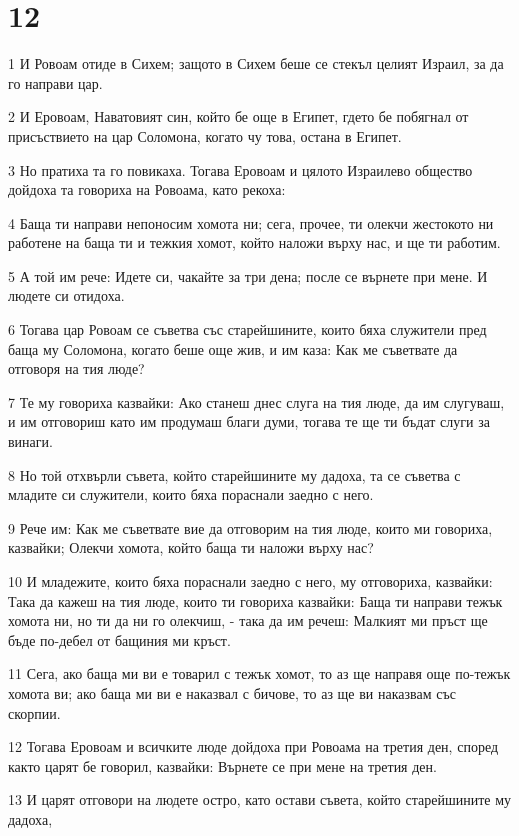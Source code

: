 \chapter{12}

\par 1 И Ровоам отиде в Сихем; защото в Сихем беше се стекъл целият Израил, за да го направи цар.
\par 2 И Еровоам, Наватовият син, който бе още в Египет, гдето бе побягнал от присъствието на цар Соломона, когато чу това, остана в Египет.
\par 3 Но пратиха та го повикаха. Тогава Еровоам и цялото Израилево общество дойдоха та говориха на Ровоама, като рекоха:
\par 4 Баща ти направи непоносим хомота ни; сега, прочее, ти олекчи жестокото ни работене на баща ти и тежкия хомот, който наложи върху нас, и ще ти работим.
\par 5 А той им рече: Идете си, чакайте за три дена; после се върнете при мене. И людете си отидоха.
\par 6 Тогава цар Ровоам се съветва със старейшините, които бяха служители пред баща му Соломона, когато беше още жив, и им каза: Как ме съветвате да отговоря на тия люде?
\par 7 Те му говориха казвайки: Ако станеш днес слуга на тия люде, да им слугуваш, и им отговориш като им продумаш благи думи, тогава те ще ти бъдат слуги за винаги.
\par 8 Но той отхвърли съвета, който старейшините му дадоха, та се съветва с младите си служители, които бяха пораснали заедно с него.
\par 9 Рече им: Как ме съветвате вие да отговорим на тия люде, които ми говориха, казвайки; Олекчи хомота, който баща ти наложи върху нас?
\par 10 И младежите, които бяха пораснали заедно с него, му отговориха, казвайки: Така да кажеш на тия люде, които ти говориха казвайки: Баща ти направи тежък хомота ни, но ти да ни го олекчиш, - така да им речеш: Малкият ми пръст ще бъде по-дебел от бащиния ми кръст.
\par 11 Сега, ако баща ми ви е товарил с тежък хомот, то аз ще направя още по-тежък хомота ви; ако баща ми ви е наказвал с бичове, то аз ще ви наказвам със скорпии.
\par 12 Тогава Еровоам и всичките люде дойдоха при Ровоама на третия ден, според както царят бе говорил, казвайки: Върнете се при мене на третия ден.
\par 13 И царят отговори на людете остро, като остави съвета, който старейшините му дадоха,
